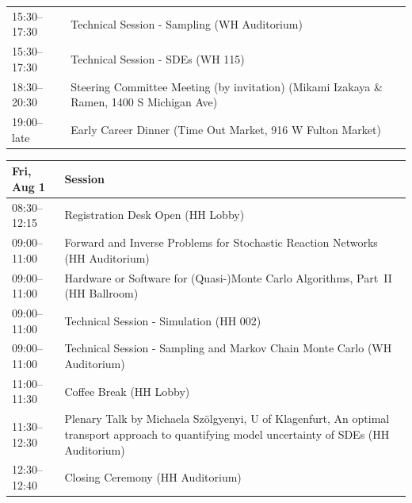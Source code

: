 \begin{table}
{\begin{tabularx}{\textwidth}{>{\hsize=0.32\hsize}X|>{\hsize=1.7\hsize}X}
\cellcolor{\SessionLightColor}15:30--17:30 & \cellcolor{\SessionLightColor}Technical Session - Sampling (WH Auditorium) \\
\cellcolor{\SessionLightColor}15:30--17:30 & \cellcolor{\SessionLightColor}Technical Session - SDEs (WH 115) \\
\cellcolor{\SessionTitleColor}18:30--20:30 & \cellcolor{\SessionTitleColor}Steering Committee Meeting (by invitation) (Mikami Izakaya \& Ramen, 1400 S Michigan Ave) \\
\cellcolor{\EmptyColor}19:00--late & \cellcolor{\EmptyColor}Early Career Dinner (Time Out Market, 916 W Fulton Market) \\
\hline
\end{tabularx}
}
\end{table}

\begin{table}
{\footnotesize
\begin{tabularx}{\textwidth}{>{\hsize=0.32\hsize}X|>{\hsize=1.7\hsize}X}
\hline
\textbf{Fri, Aug 1} & \textbf{Session} \\
\hline
\cellcolor{\EmptyColor}08:30--12:15 & \cellcolor{\EmptyColor}Registration Desk Open (HH Lobby) \\
\cellcolor{\SessionTitleColor}09:00--11:00 & \cellcolor{\SessionTitleColor}Forward and Inverse Problems for Stochastic Reaction Networks (HH Auditorium) \\
\cellcolor{\SessionTitleColor}09:00--11:00 & \cellcolor{\SessionTitleColor}Hardware or Software for (Quasi-)Monte Carlo Algorithms, Part~II (HH Ballroom) \\
\cellcolor{\SessionLightColor}09:00--11:00 & \cellcolor{\SessionLightColor}Technical Session - Simulation (HH 002) \\
\cellcolor{\SessionLightColor}09:00--11:00 & \cellcolor{\SessionLightColor}Technical Session - Sampling and Markov Chain Monte Carlo (WH Auditorium) \\
\cellcolor{\EmptyColor}11:00--11:30 & \cellcolor{\EmptyColor}Coffee Break (HH Lobby) \\
\cellcolor{\PlenaryColor}11:30--12:30 & \cellcolor{\PlenaryColor}Plenary Talk by Michaela Sz\"olgyenyi, U of Klagenfurt, An optimal transport approach to quantifying model uncertainty of SDEs (HH Auditorium) \\
\cellcolor{\OpeningClosingColor}12:30--12:40 & \cellcolor{\OpeningClosingColor}Closing Ceremony (HH Auditorium) \\
\hline
\end{tabularx}
}
\end{table}

